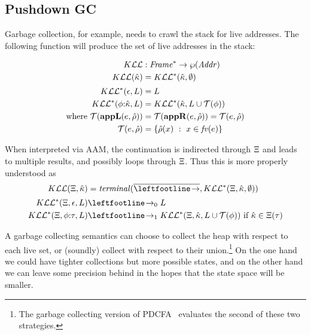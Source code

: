 \subsection{Pushdown GC}
Garbage collection, for example, needs to crawl the stack for live addresses.
%
The following function will produce the set of live addresses in the stack:

\begin{align*}
  K{\mathcal L}{\mathcal L} &: \mathit{Frame}^* \to \wp(\mathit{Addr}) \\
  K{\mathcal L}{\mathcal L}(\hat{\kappa}) &= K{\mathcal L}{\mathcal L}^*(\hat{\kappa},\emptyset) \\[2pt]
  K{\mathcal L}{\mathcal L}^*(\epsilon,L) &= L \\
  K{\mathcal L}{\mathcal L}^*(\phi{\tt :} \hat{\kappa}, L) &= K{\mathcal L}{\mathcal L}^*(\hat{\kappa}, L\cup{\mathcal T}(\phi)) \\
  \text{where } {\mathcal T}(\mathbf{appL}(e,\hat{\rho})) &= {\mathcal T}(\mathbf{appR}(e,\hat{\rho})) = {\mathcal T}(e,\hat{\rho}) \\
                {\mathcal T}(e,\hat{\rho}) &= \{ \hat{\rho}(x)\ :\ x \in \mathit{fv}(e)\}
\end{align*}

When interpreted via AAM, the continuation is indirected through $\Xi$ and leads to multiple results, and possibly loops through $\Xi$.
%
Thus this is more properly understood as
\begin{align*}
  \kontlive(\mktab,\makont) &= \terminal(\overline{\stepto},\kontliveaux(\mktab,\makont,\emptyset)) \\[2pt]
  \kontliveaux(\mktab,\epsilon,L) &\stepto_0 L \\
  \kontliveaux(\mktab,\kcons{\mkframe}{\mctx}, L) &\stepto_1 \kontliveaux(\mktab,\makont, L\cup\touches(\mkframe)) \text{ if } \makont \in \mktab(\mctx)
\end{align*}
%

A garbage collecting semantics can choose to collect the heap with respect to each live set, or (soundly) collect with respect to their union.\footnote{The garbage collecting version of PDCFA~\citep{ianjohnson:DBLP:journals/jfp/JohnsonSEMH14} evaluates the second of these two strategies.}
%
On the one hand we could have tighter collections but more possible states, and on the other hand we can leave some precision behind in the hopes that the state space will be smaller.
%

